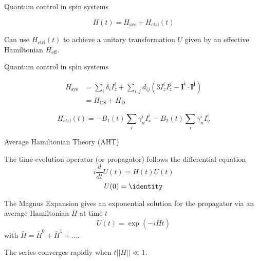 \documentclass{beamer}
\begin{document}
\begin{frame}{Quantum control in spin systems}

\[
    H(t) = H_{\text{sys}} + H_{\text{ctrl}}(t)
\]

Can use $H_{\text{ctrl}}(t)$ to achieve
a unitary transformation $U$ given by an effective Hamiltonian $H_\text{eff}$.


\begin{figure}
\centering

\end{figure}

\end{frame}


\begin{frame}{Quantum control in spin systems}


\begin{align*}
    H_{\text{sys}} &= \sum_i \delta_i I_z^i + \sum_{i,j} d_{ij} \left( 3I_z^iI_z^j - \mathbf{I^i} \cdot \mathbf{I^j} \right) \\
        &= H_\text{CS} + H_\text{D}
\end{align*}

\[
    H_{\text{ctrl}}(t) = -B_1(t) \sum_i \gamma_n^i I_x^i -B_2(t) \sum_i \gamma_n^i I_y^i
\]

\end{frame}


\begin{frame}{Average Hamiltonian Theory (AHT)}

The time-evolution operator (or propagator) follows the differential
equation \[
i \frac{d}{dt} U(t) = H(t)U(t)
\] \[
U(0) = \identity
\]

The Magnus Expansion gives an exponential solution for the propagator
via an average Hamiltonian \(\overline{H}\) at time \(t\) \[
U(t) = \exp\left( -i \overline{H} t \right)
\] with \(\overline{H} = \overline{H}^0 + \overline{H}^1 + \dots\).

The series converges rapidly when \(t||H|| \ll 1\).

\end{frame}
\end{document}
